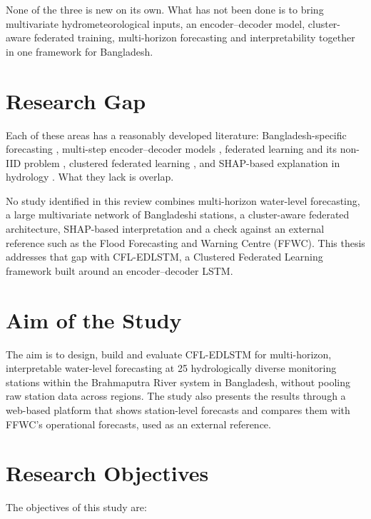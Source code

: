 None of the three is new on its own. What has not been done is to bring
multivariate hydrometeorological inputs, an encoder--decoder model,
cluster-aware federated training, multi-horizon forecasting and
interpretability together in one framework for Bangladesh.

\section{Research Gap}
\label{sec:1.6}

Each of these areas has a reasonably developed literature: Bangladesh-specific
forecasting
\cite{Islam2026a,Islam2026b,Ruma2023,Rakin2023,Rajab2023,HemelSakib2024},
multi-step encoder--decoder models \cite{Kao2020,Cui2022,Lim2025,Yuan2023},
federated learning and its non-IID problem \cite{McMahan2017,Zhu2021,Chen2025},
clustered federated learning \cite{Ghosh2021,Harshvardhan2022,BenAli2026}, and
SHAP-based explanation in hydrology \cite{Lundberg2017,Huang2024,Khorrami2025}.
What they lack is overlap.

No study identified in this review combines multi-horizon water-level
forecasting, a large multivariate network of Bangladeshi stations, a
cluster-aware federated architecture, SHAP-based interpretation and a check
against an external reference such as the Flood Forecasting and Warning Centre
(FFWC). This thesis addresses that gap with CFL-EDLSTM, a Clustered Federated
Learning framework built around an encoder--decoder LSTM.

\section{Aim of the Study}
\label{sec:1.7}

The aim is to design, build and evaluate CFL-EDLSTM for multi-horizon,
interpretable water-level forecasting at 25 hydrologically diverse monitoring
stations within the Brahmaputra River system in Bangladesh, without pooling raw
station data across regions. The study also presents the results through a
web-based platform that shows station-level forecasts and compares them with
FFWC's operational forecasts, used as an external reference.

\section{Research Objectives}
\label{sec:1.8}

The objectives of this study are:

